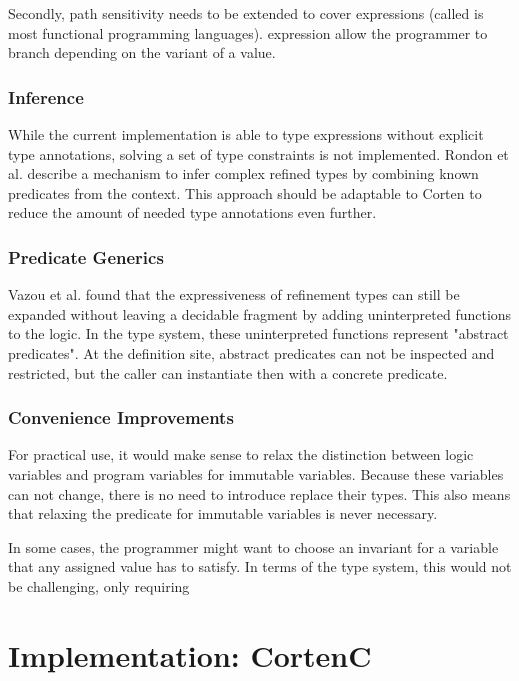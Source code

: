 \documentclass[twoside, english]{sdqthesis}
\theoremstyle{definition}
\begin{document}
Secondly, path sensitivity needs to be extended to cover  expressions (called  is most functional programming languages).  expression allow the programmer to branch depending on the variant of a value.

\subsection{Inference}

While the current implementation is able to type expressions without explicit type annotations, solving a set of type constraints is not implemented. 
Rondon et al. \cite{rondon_liquid_2008} describe a mechanism to infer complex refined types by combining known predicates from the context. This approach should be adaptable to Corten to reduce the amount of needed type annotations even further.


\subsection{Predicate Generics}

Vazou et al. \cite{vazou_abstract_2013} found that the expressiveness of refinement types can still be expanded without leaving a decidable fragment by adding uninterpreted functions to the logic. In the type system, these uninterpreted functions represent "abstract predicates". At the definition site, abstract predicates can not be inspected and restricted, but the caller can instantiate then with a concrete predicate.

\subsection{Convenience Improvements}

For practical use, it would make sense to relax the distinction between logic variables and program variables for immutable variables. Because these variables can not change, there is no need to introduce replace their types. This also means that relaxing the predicate for immutable variables is never necessary.

In some cases, the programmer might want to choose an invariant for a variable that any assigned value has to satisfy. In terms of the type system, this would not be challenging, only requiring 

\chapter{Implementation: CortenC} \label{ch:implementation}
\end{document}
